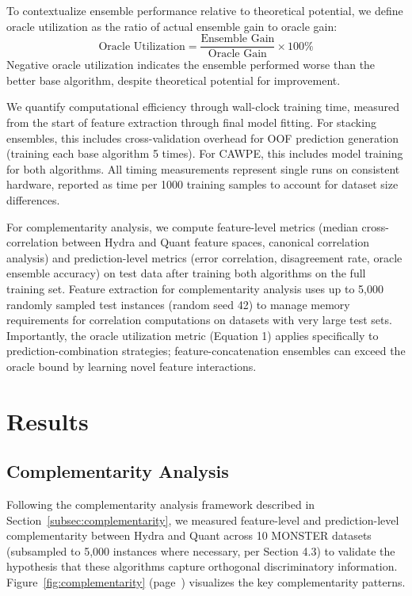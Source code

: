 \documentclass[pdflatex,sn-basic]{sn-jnl}           %
\theoremstyle{thmstyleone}%
\theoremstyle{thmstyletwo}%
\theoremstyle{thmstylethree}%
\begin{document}
To contextualize ensemble performance relative to theoretical potential, we define oracle utilization as the ratio of actual ensemble gain to oracle gain:
\begin{equation}
\text{Oracle Utilization} = \frac{\text{Ensemble Gain}}{\text{Oracle Gain}} \times 100\%
\end{equation}
Negative oracle utilization indicates the ensemble performed worse than the better base algorithm, despite theoretical potential for improvement.

We quantify computational efficiency through wall-clock training time, measured from the start of feature extraction through final model fitting. For stacking ensembles, this includes cross-validation overhead for OOF prediction generation (training each base algorithm 5 times). For CAWPE, this includes model training for both algorithms. All timing measurements represent single runs on consistent hardware, reported as time per 1000 training samples to account for dataset size differences.

For complementarity analysis, we compute feature-level metrics (median cross-correlation between Hydra and Quant feature spaces, canonical correlation analysis) and prediction-level metrics (error correlation, disagreement rate, oracle ensemble accuracy) on test data after training both algorithms on the full training set. Feature extraction for complementarity analysis uses up to 5,000 randomly sampled test instances (random seed 42) to manage memory requirements for correlation computations on datasets with very large test sets. Importantly, the oracle utilization metric (Equation 1) applies specifically to prediction-combination strategies; feature-concatenation ensembles can exceed the oracle bound by learning novel feature interactions.

\clearpage

\section{Results}\label{sec5}

\subsection{Complementarity Analysis}

Following the complementarity analysis framework described in Section~\ref{subsec:complementarity}, we measured feature-level and prediction-level complementarity between Hydra and Quant across 10 MONSTER datasets (subsampled to 5,000 instances where necessary, per Section 4.3) to validate the hypothesis that these algorithms capture orthogonal discriminatory information. Figure~\ref{fig:complementarity} (page~\pageref{fig:complementarity}) visualizes the key complementarity patterns.
\end{document}

